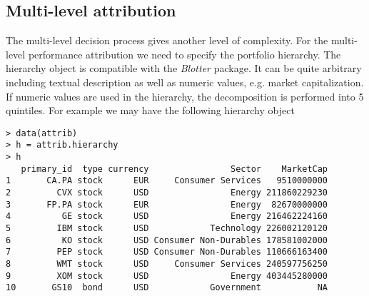 \documentclass[11pt,a4paper]{article}
\begin{document}
\subsection{Multi-level attribution}
The multi-level decision process gives another level of complexity. For the multi-level performance attribution we need to specify the portfolio hierarchy. The hierarchy object is compatible with the \textit{Blotter} package. It can be quite arbitrary including textual description as well as numeric values, e.g. market capitalization. If numeric values are used in the hierarchy, the decomposition is performed into 5 quintiles. For example we may have the following hierarchy object
\begingroup
\fontsize{9pt}{12pt}\selectfont
\begin{verbatim}
> data(attrib)
> h = attrib.hierarchy
> h
   primary_id  type currency                Sector    MarketCap
1       CA.PA stock      EUR     Consumer Services   9510000000
2         CVX stock      USD                Energy 211860229230
3       FP.PA stock      EUR                Energy  82670000000
4          GE stock      USD                Energy 216462224160
5         IBM stock      USD            Technology 226002120120
6          KO stock      USD Consumer Non-Durables 178581002000
7         PEP stock      USD Consumer Non-Durables 110666163400
8         WMT stock      USD     Consumer Services 240597756250
9         XOM stock      USD                Energy 403445280000
10       GS10  bond      USD            Government           NA
\end{verbatim}
\endgroup
\end{document}
